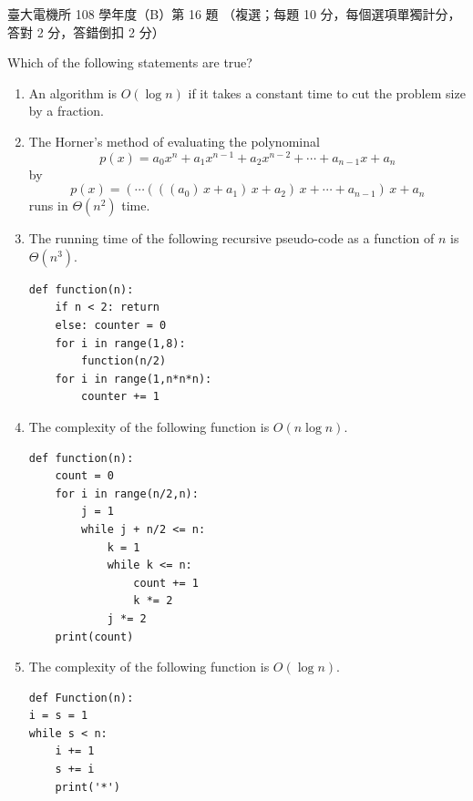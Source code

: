 \begin{pastexam}[label={px:ntu-108-ee-dsb-16}]{臺大電機所 108 學年度（B）第 16 題}
（複選；每題 10 分，每個選項單獨計分，答對 2 分，答錯倒扣 2 分）

Which of the following statements are true?
\begin{enumerate}[label=(\Alph*).]
\item An algorithm is $O(\log n)$ if it takes a constant time to cut the problem size by a fraction.
\item The Horner's method of evaluating the polynominal
\[ p(x) = a_0x^n + a_1x^{n-1} + a_2x^{n-2} + \cdots + a_{n-1}x + a_n \]
by
\[ p(x) = (\cdots(((a_0)\,x + a_1)\,x + a_2)\,x + \cdots + a_{n-1})\,x + a_n \]
runs in $\Theta(n^2)$ time.
\item The running time of the following recursive pseudo-code as a function of $n$ is
$\Theta(n^3)$.
\begin{verbatim}
def function(n):
    if n < 2: return
    else: counter = 0
    for i in range(1,8):
        function(n/2)
    for i in range(1,n*n*n):
        counter += 1
\end{verbatim}
\item The complexity of the following function is $O(n\log n)$.
\begin{verbatim}
def function(n):
    count = 0
    for i in range(n/2,n):
        j = 1
        while j + n/2 <= n:
            k = 1
            while k <= n:
                count += 1
                k *= 2
            j *= 2
    print(count)
\end{verbatim}
\item The complexity of the following function is $O(\log n)$.
\begin{verbatim}
def Function(n):
i = s = 1
while s < n:
    i += 1
    s += i
    print('*')
\end{verbatim}
\end{enumerate}
\end{pastexam}

